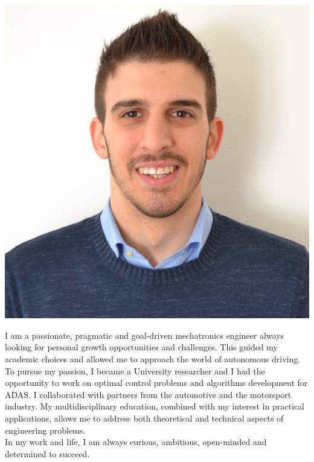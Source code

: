 \documentclass[9pt]{developercv_mattia} %
\begin{document}
\hfill
\begin{minipage}[t]{0.20\textwidth} %
	\vspace{-\baselineskip} %
		\hfill
	\includegraphics[width=1.0\linewidth]{../shared/Fototessera.jpg}
\end{minipage}
%
%
%
\begin{minipage}[t]{0.54\textwidth} %
%

I am a passionate, pragmatic and goal-driven mechatronics engineer always looking for personal growth opportunities and challenges. This guided my academic choices and allowed me to approach the world of autonomous driving.
To pursue my passion, I became a University researcher and I had the opportunity to work on optimal control problems and algorithms development for ADAS. I collaborated with partners from the automotive and the motorsport industry.
My multidisciplinary education, combined with my interest in practical applications, allows me to address both theoretical and technical aspects of engineering problems.\\
In my work and life, I am always curious, ambitious, open-minded and determined to succeed.
%
\end{minipage}
\end{document}
